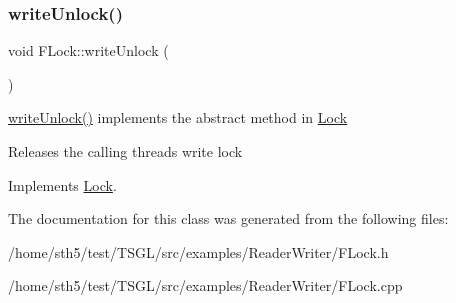 \mbox{\label{class_f_lock_afb22121c126a71c24e751ae7315e9a48}} 
\subsubsection{\texorpdfstring{write\+Unlock()}{writeUnlock()}}
{\footnotesize\ttfamily void F\+Lock\+::write\+Unlock (\begin{DoxyParamCaption}{ }\end{DoxyParamCaption})\hspace{0.3cm}{\ttfamily [virtual]}}



\hyperlink{class_f_lock_afb22121c126a71c24e751ae7315e9a48}{write\+Unlock()} implements the abstract method in \hyperlink{class_lock}{Lock} 

Releases the calling thread\textquotesingle{}s write lock 

Implements \hyperlink{class_lock}{Lock}.



The documentation for this class was generated from the following files\+:\begin{DoxyCompactItemize}
\item 
/home/sth5/test/\+T\+S\+G\+L/src/examples/\+Reader\+Writer/F\+Lock.\+h\item 
/home/sth5/test/\+T\+S\+G\+L/src/examples/\+Reader\+Writer/F\+Lock.\+cpp\end{DoxyCompactItemize}
